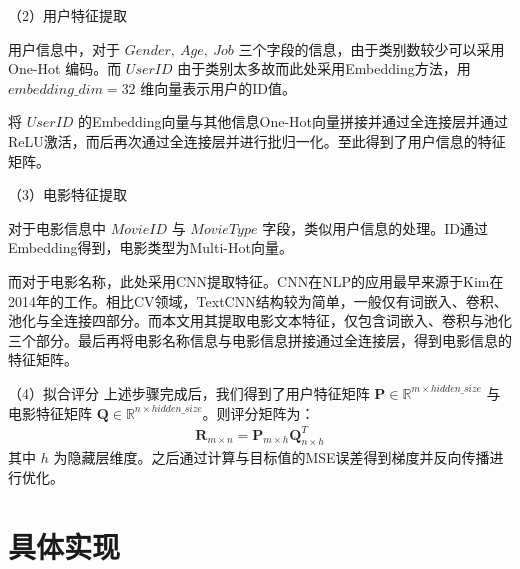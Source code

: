 \begin{spacing}{1.5}
\par

（2）用户特征提取\par
用户信息中，对于 $Gender,\ Age,\ Job$ 三个字段的信息，由于类别数较少可以采用 One-Hot 编码。而 $UserID$ 由于类别太多故而此处采用Embedding方法，用$embedding\_ dim=32$ 维向量表示用户的ID值。\par
将 $UserID$ 的Embedding向量与其他信息One-Hot向量拼接并通过全连接层并通过 ReLU激活，而后再次通过全连接层并进行批归一化。至此得到了用户信息的特征矩阵。\par
（3）电影特征提取\par
对于电影信息中 $MovieID$ 与 $MovieType$ 字段，类似用户信息的处理。ID通过Embedding得到，电影类型为Multi-Hot向量。\par
而对于电影名称，此处采用CNN提取特征。CNN在NLP的应用最早来源于Kim在2014年的工作\cite{4}。相比CV领域，TextCNN结构较为简单，一般仅有词嵌入、卷积、池化与全连接四部分。而本文用其提取电影文本特征，仅包含词嵌入、卷积与池化三个部分。最后再将电影名称信息与电影信息拼接通过全连接层，得到电影信息的特征矩阵。\par
（4）拟合评分
上述步骤完成后，我们得到了用户特征矩阵 $\mathbf{P} \in \mathbb{R}^{m \times hidden\_ size}$ 与电影特征矩阵 $\mathbf{Q} \in \mathbb{R}^{n \times hidden\_ size}$。则评分矩阵为：
{\setlength\abovedisplayskip{1pt}
\setlength\belowdisplayskip{1pt}
\begin{align}
\mathbf{R}_{m\times n}=\mathbf{P}_{m\times h}\mathbf{Q}_{n\times h}^T
\end{align}
}
其中 $h$ 为隐藏层维度。之后通过计算与目标值的MSE误差得到梯度并反向传播进行优化。
\end{spacing}

\section{具体实现}
